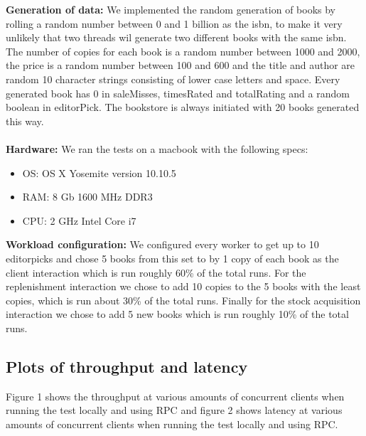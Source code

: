 \documentclass{article}
\theoremstyle{plain}
\theoremstyle{nonumberplain}
\begin{document}
\textbf{Generation of data:}
We implemented the random generation of books by rolling a random number between 0 and 1 billion as the isbn, to make it very unlikely that two threads wil generate two different books with the same isbn. The number of copies for each book is a random number between 1000 and 2000, the price is a random number between 100 and 600 and the title and author are random 10 character strings consisting of lower case letters and space. Every generated book has 0 in saleMisses, timesRated and totalRating and a random boolean in editorPick. The bookstore is always initiated with 20 books generated this way.\\\\
\textbf{Hardware:}
We ran the tests on a macbook with the following specs:
\begin{itemize}
	\item OS: OS X Yosemite version 10.10.5
	\item RAM: 8 Gb 1600 MHz DDR3
	\item CPU: 2 GHz Intel Core i7
\end{itemize}
\textbf{Workload configuration:}
We configured every worker to get up to 10 editorpicks and chose 5 books from this set to by 1 copy of each book as the client interaction which is run roughly 60\% of the total runs. For the replenishment interaction we chose to add 10 copies to the 5 books with the least copies, which is run about 30\% of the total runs. Finally for the stock acquisition interaction we chose to add 5 new books which is run roughly 10\% of the total runs.


\subsection{Plots of throughput and latency}

Figure 1 shows the throughput at various amounts of concurrent clients when running the test locally and using RPC and figure 2 shows latency at various amounts of concurrent clients when running the test locally and using RPC.
\end{document}
